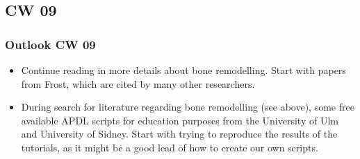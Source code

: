 \subsection{CW 09}
\begin{frame}
  \frametitle{Outlook CW 09}
	\begin{itemize}
		\item Continue reading in more details about bone remodelling. Start with papers from Frost, which are cited by many other researchers.
		\item During search for literature regarding bone remodelling (see above), some free available APDL scripts for education purposes from the University of Ulm and University of Sidney. Start with trying to reproduce the results of the tutorials, as it might be a good lead of how to create our own scripts.
	\end{itemize}
\end{frame}

